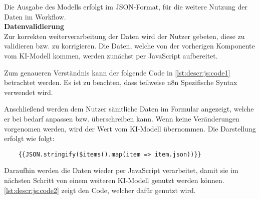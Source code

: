 Die Ausgabe des Modells erfolgt im JSON-Format, für die weitere Nutzung der Daten im Workflow. \\

\textbf{Datenvalidierung} \\
Zur korrekten weiterverarbeitung der Daten wird der Nutzer gebeten, diese zu validieren bzw. zu korrigieren.
Die Daten, welche von der vorherigen Komponente vom KI-Modell kommen, werden zunächst per JavaScript aufbereitet.

Zum genaueren Verständnis kann der folgende Code in \autoref{lst:descr:js:code1} betrachtet werden. Es ist zu beachten, dass teilweise n8n Spezifische Syntax verwendet wird.

Anschließend werden dem Nutzer sämtliche Daten im Formular angezeigt, welche er bei bedarf anpassen bzw. überschreiben kann.
Wenn keine Veränderungen vorgenomen werden, wird der Wert vom KI-Modell übernommen.
Die Darstellung erfolgt wie folgt:
\begin{verbatim}
    {{JSON.stringify($items().map(item => item.json))}}
\end{verbatim}

Daraufhin werden die Daten wieder per JavaScript verarbeitet, damit sie im nächsten Schritt von einem weiteren KI-Modell genutzt werden können.
\autoref{lst:descr:js:code2} zeigt den Code, welcher dafür genutzt wird. \\

